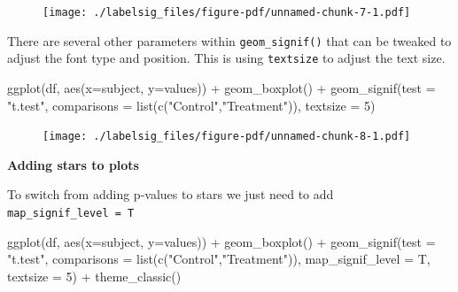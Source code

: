 \documentclass[
  letterpaper,
  DIV=11,
  numbers=noendperiod]{scrreprt}
\newenvironment{Shaded}{\begin{snugshade}}{\end{snugshade}}
\newcommand{\AttributeTok}[1]{\textcolor[rgb]{0.40,0.45,0.13}{#1}}
\newcommand{\DecValTok}[1]{\textcolor[rgb]{0.68,0.00,0.00}{#1}}
\newcommand{\FunctionTok}[1]{\textcolor[rgb]{0.28,0.35,0.67}{#1}}
\newcommand{\NormalTok}[1]{\textcolor[rgb]{0.00,0.23,0.31}{#1}}
\newcommand{\SpecialCharTok}[1]{\textcolor[rgb]{0.37,0.37,0.37}{#1}}
\newcommand{\StringTok}[1]{\textcolor[rgb]{0.13,0.47,0.30}{#1}}
\begin{document}
\begin{figure}[H]

{\centering \texttt{[image: ./labelsig\_files/figure-pdf/unnamed-chunk-7-1.pdf]}

}

\end{figure}

There are several other parameters within \texttt{geom\_signif()} that
can be tweaked to adjust the font type and position. This is using
\texttt{textsize} to adjust the text size.

\begin{Shaded}
\begin{Highlighting}[]
\FunctionTok{ggplot}\NormalTok{(df, }\FunctionTok{aes}\NormalTok{(}\AttributeTok{x=}\NormalTok{subject, }\AttributeTok{y=}\NormalTok{values)) }\SpecialCharTok{+}
  \FunctionTok{geom\_boxplot}\NormalTok{() }\SpecialCharTok{+}
  \FunctionTok{geom\_signif}\NormalTok{(}\AttributeTok{test =} \StringTok{"t.test"}\NormalTok{, }
              \AttributeTok{comparisons =} \FunctionTok{list}\NormalTok{(}\FunctionTok{c}\NormalTok{(}\StringTok{"Control"}\NormalTok{,}\StringTok{"Treatment"}\NormalTok{)),}
              \AttributeTok{textsize =} \DecValTok{5}\NormalTok{)}
\end{Highlighting}
\end{Shaded}

\begin{figure}[H]

{\centering \texttt{[image: ./labelsig\_files/figure-pdf/unnamed-chunk-8-1.pdf]}

}

\end{figure}

\textbf{Adding stars to plots}

To switch from adding p-values to stars we just need to add
\texttt{map\_signif\_level\ =\ T}

\begin{Shaded}
\begin{Highlighting}[]
\FunctionTok{ggplot}\NormalTok{(df, }\FunctionTok{aes}\NormalTok{(}\AttributeTok{x=}\NormalTok{subject, }\AttributeTok{y=}\NormalTok{values)) }\SpecialCharTok{+}
  \FunctionTok{geom\_boxplot}\NormalTok{() }\SpecialCharTok{+}
  \FunctionTok{geom\_signif}\NormalTok{(}\AttributeTok{test =} \StringTok{"t.test"}\NormalTok{, }
              \AttributeTok{comparisons =} \FunctionTok{list}\NormalTok{(}\FunctionTok{c}\NormalTok{(}\StringTok{"Control"}\NormalTok{,}\StringTok{"Treatment"}\NormalTok{)),}
              \AttributeTok{map\_signif\_level =}\NormalTok{ T,}
              \AttributeTok{textsize =} \DecValTok{5}\NormalTok{) }\SpecialCharTok{+}
  \FunctionTok{theme\_classic}\NormalTok{()}
\end{Highlighting}
\end{Shaded}
\end{document}
